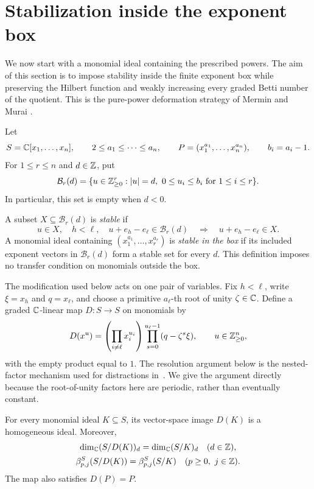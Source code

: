 \section{Stabilization inside the exponent box}
\label{sec:stabilization}

We now start with a monomial ideal containing the prescribed powers.
The aim of this section is to impose stability inside the finite exponent
box while preserving the Hilbert function and weakly increasing every
graded Betti number of the quotient. This is the pure-power
deformation strategy of Mermin and Murai \cite[Section~3]{MM}.

Let
\[
 S=\mathbb C[x_1,\ldots,x_n],\qquad
 2\le a_1\le\cdots\le a_n,\qquad
 P=(x_1^{a_1},\ldots,x_n^{a_n}),\qquad b_i=a_i-1.
\]
For $1\le r\le n$ and $d\in\mathbb Z$, put
\[
 \mathcal B_r(d)
 =\{u\in\mathbb Z_{\ge0}^r: |u|=d,\ 0\le u_i\le b_i
                          \text{ for }1\le i\le r\}.
\]
In particular, this set is empty when $d<0$.

\begin{definition}
\label{stab:definition}
A subset $X\subseteq\mathcal B_r(d)$ is \emph{stable} if
\[
 u\in X,\quad h<\ell,\quad
 u+e_h-e_\ell\in\mathcal B_r(d)
 \quad\Longrightarrow\quad u+e_h-e_\ell\in X.
\]
A monomial ideal containing $(x_1^{a_1},\ldots,x_r^{a_r})$ is
\emph{stable in the box} if its included exponent vectors in
$\mathcal B_r(d)$ form a stable set for every $d$.
This definition imposes no transfer condition on monomials outside the box.
\end{definition}

The modification used below acts on one pair of variables.  Fix
$h<\ell$, write $\xi=x_h$ and $q=x_\ell$, and choose a primitive
$a_\ell$-th root of unity $\zeta\in\mathbb C$.  Define a graded
$\mathbb C$-linear map $D:S\to S$ on monomials by
\begin{equation}
\label{stab:distraction-formula}
 D(x^u)=\left(\prod_{i\ne\ell}x_i^{u_i}\right)
             \prod_{s=0}^{u_\ell-1}(q-\zeta^s\xi),
 \qquad u\in\mathbb Z_{\ge0}^n,
\end{equation}
with the empty product equal to $1$.
The resolution argument below is the nested-factor mechanism used for
distractions in~\cite[Theorem~2.19 and Corollary~2.20]{BCR}.
We give the argument directly because the
root-of-unity factors here are periodic, rather than eventually constant.

\begin{lemma}
\label{stab:distraction}
For every monomial ideal $K\subseteq S$, its vector-space image $D(K)$
is a homogeneous ideal.  Moreover,
\begin{gather*}
 \dim_\mathbb C(S/D(K))_d=\dim_\mathbb C(S/K)_d
 \quad(d\in\mathbb Z),\\
 \beta^S_{p,j}(S/D(K))=\beta^S_{p,j}(S/K)
 \quad(p\ge0,\ j\in\mathbb Z).
\end{gather*}
The map also satisfies $D(P)=P$.
\end{lemma}


